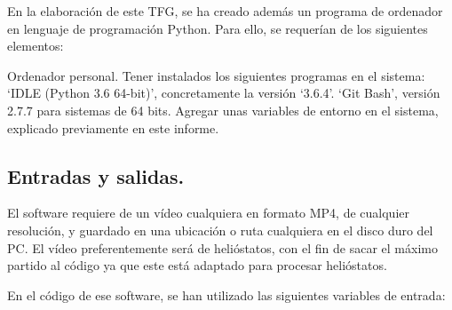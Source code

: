 En la elaboración de este TFG, se ha creado además un programa de ordenador en lenguaje de programación Python. Para ello, se requerían de los siguientes elementos:

Ordenador personal.
Tener instalados los siguientes programas en el sistema:
‘IDLE (Python 3.6 64-bit)’, concretamente la versión ‘3.6.4’.
‘Git Bash’, versión 2.7.7 para sistemas de 64 bits.
Agregar unas variables de entorno en el sistema, explicado previamente en este informe.

\subsection{Entradas y salidas.}

El software requiere de un vídeo cualquiera en formato MP4, de cualquier resolución, y guardado en una ubicación o ruta cualquiera en el disco duro del PC. El vídeo preferentemente será de helióstatos, con el fin de sacar el máximo partido al código ya que este está adaptado para procesar helióstatos.

En el código de ese software, se han utilizado las siguientes variables de entrada:

